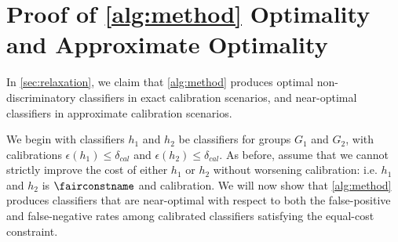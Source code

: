 \section{Proof of \autoref{alg:method} Optimality and Approximate Optimality}
\label{sec:optimality-proofs}

In \autoref{sec:relaxation}, we claim that \autoref{alg:method} produces
optimal non-discriminatory classifiers in exact calibration scenarios,
and near-optimal classifiers in approximate calibration scenarios.

We begin with classifiers $h_1$ and $h_2$ be classifiers for groups $G_1$ and
$G_2$, with calibrations $\epsilon(h_1) \le \delta_{cal}$ and $\epsilon(h_2)
\le \delta_{cal}$. As before, assume that we cannot strictly
improve the cost of either $h_1$ or $h_2$ without worsening calibration: i.e. $h_1$ and
$h_2$ is $\fairconstname$ and calibration. We will now show that
\autoref{alg:method} produces classifiers that are
near-optimal with respect to both the false-positive and false-negative rates
among calibrated classifiers satisfying the equal-cost constraint.

